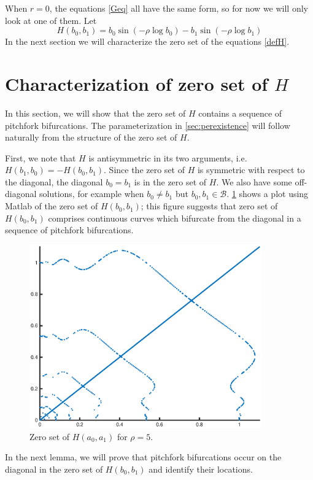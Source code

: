 \documentclass[thesis.tex]{subfiles}
\begin{document}
When $r = 0$, the equations \eqref{Geq} all have the same form, so for now we will only look at one of them. Let
\begin{equation}\label{defH}
H(b_0, b_1) = b_0 \sin \left( -\rho \log b_0 \right) - b_1 \sin \left( -\rho \log b_1 \right)
\end{equation}
In the next section we will characterize the zero set of the equations \cref{defH}. 

\section{Characterization of zero set of $H$}

In this section, we will show that the zero set of $H$ contains a sequence of pitchfork bifurcations. The parameterization in \cref{sec:perexistence} will follow naturally from the structure of the zero set of $H$.

First, we note that $H$ is antisymmetric in its two arguments, i.e. $H(b_1, b_0) = -H(b_0, b_1)$. Since the zero set of $H$ is symmetric with respect to the diagonal, the diagonal $b_0 = b_1$ is in the zero set of $H$. We also have some off-diagonal solutions, for example when $b_0 \neq b_1$ but $b_0, b_1 \in \mathcal{B}$. \cref{fig:Fzeronumeric} shows a plot using Matlab of the zero set of $H(b_0, b_1)$; this figure suggests that zero set of $H(b_0, b_1)$ comprises continuous curves which bifurcate from the diagonal in a sequence of pitchfork bifurcations.

\begin{figure}
\label{fig:Fzeronumeric}
\includegraphics[width=10cm]{periodic/zeroset5}
\caption{Zero set of $H(a_0, a_1)$ for $\rho = 5$.}
\end{figure} 

In the next lemma, we will prove that pitchfork bifurcations occur on the diagonal in the zero set of $H(b_0, b_1)$ and identify their locations.
\end{document}
